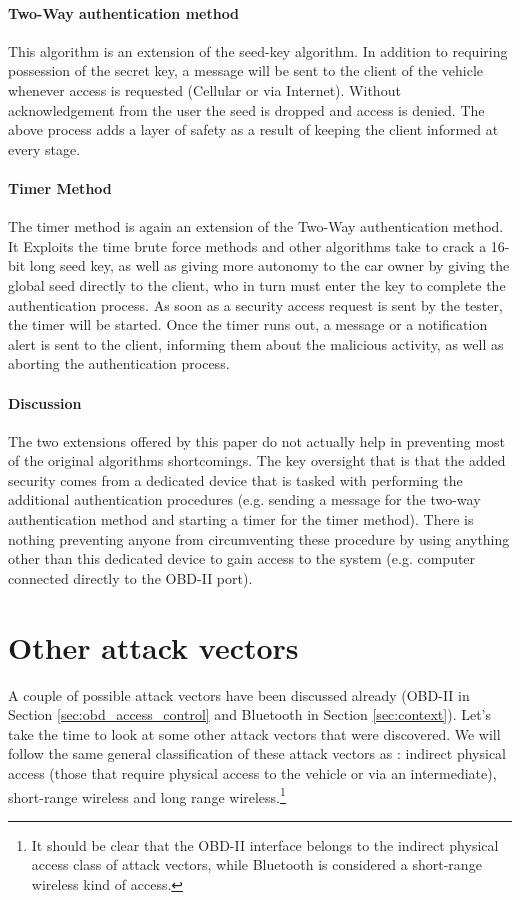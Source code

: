\paragraph{Two-Way authentication method}
This algorithm is an extension of the seed-key algorithm. In addition to requiring possession of the secret key, a message will be sent to the client of the vehicle whenever access is requested (Cellular or via Internet). Without acknowledgement from the user the seed is dropped and access is denied. The above process adds a layer of safety as a result of keeping the client informed at every stage.

\paragraph{Timer Method}  
The timer method is again an extension of the Two-Way authentication method. It Exploits the time brute force methods and other algorithms take to crack a 16-bit long seed key, as well as giving more autonomy to the car owner by giving the global seed directly to the client, who in turn must enter the key to complete the authentication process. As soon as a security access request is sent by the tester, the timer will be started. Once the timer runs out, a message or a notification alert is sent to the client, informing them about the malicious activity, as well as aborting the authentication process. 

\paragraph{Discussion} 
The two extensions offered by this paper do not actually help in preventing most of the original algorithms shortcomings. The key oversight that is that the added security comes from a dedicated device that is tasked with performing the additional authentication procedures (e.g. sending a message for the two-way authentication method and starting a timer for the timer method). There is nothing preventing anyone from circumventing these procedure by using anything other than this dedicated device to gain access to the system (e.g. computer connected directly to the OBD-II port). 

\section{Other attack vectors}
\label{sec:other_attack_vectors}

A couple of possible attack vectors have been discussed already (OBD-II in Section \ref{sec:obd_access_control} and Bluetooth in Section \ref{sec:context}). Let's take the time to look at some other attack vectors that were discovered. We will follow the same general classification of these attack vectors as \cite{Kosher}: indirect physical access (those that require physical access to the vehicle or via an intermediate), short-range wireless and long range wireless.\footnote{It should be clear that the OBD-II interface belongs to the indirect physical access class of attack vectors, while Bluetooth is considered a short-range wireless kind of access.}

